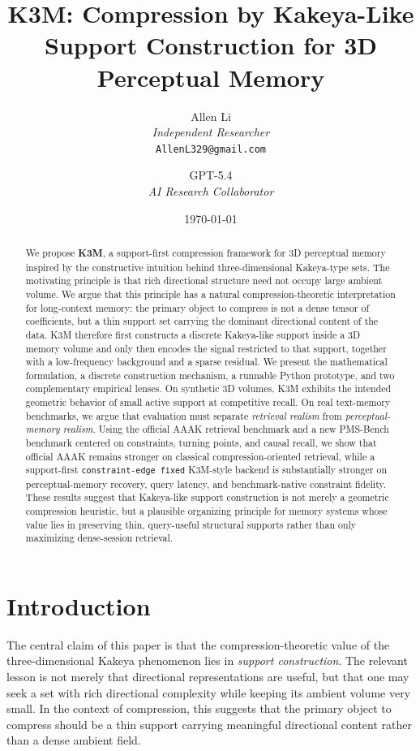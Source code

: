 \documentclass[11pt]{article}
\title{K3M: Compression by Kakeya-Like Support Construction for 3D Perceptual Memory}
\author{
Allen Li \\
\textit{Independent Researcher} \\
\texttt{AllenL329@gmail.com}
\and
GPT-5.4 \\
\textit{AI Research Collaborator}
}
\date{\today}
\begin{document}
\maketitle

\begin{abstract}
We propose \textbf{K3M}, a support-first compression framework for 3D perceptual memory inspired by the constructive intuition behind three-dimensional Kakeya-type sets. The motivating principle is that rich directional structure need not occupy large ambient volume. We argue that this principle has a natural compression-theoretic interpretation for long-context memory: the primary object to compress is not a dense tensor of coefficients, but a thin support set carrying the dominant directional content of the data. K3M therefore first constructs a discrete Kakeya-like support inside a 3D memory volume and only then encodes the signal restricted to that support, together with a low-frequency background and a sparse residual. We present the mathematical formulation, a discrete construction mechanism, a runnable Python prototype, and two complementary empirical lenses. On synthetic 3D volumes, K3M exhibits the intended geometric behavior of small active support at competitive recall. On real text-memory benchmarks, we argue that evaluation must separate \emph{retrieval realism} from \emph{perceptual-memory realism}. Using the official AAAK retrieval benchmark and a new PMS-Bench benchmark centered on constraints, turning points, and causal recall, we show that official AAAK remains stronger on classical compression-oriented retrieval, while a support-first \texttt{constraint-edge fixed} K3M-style backend is substantially stronger on perceptual-memory recovery, query latency, and benchmark-native constraint fidelity. These results suggest that Kakeya-like support construction is not merely a geometric compression heuristic, but a plausible organizing principle for memory systems whose value lies in preserving thin, query-useful structural supports rather than only maximizing dense-session retrieval.
\end{abstract}

\section{Introduction}
The central claim of this paper is that the compression-theoretic value of the three-dimensional Kakeya phenomenon lies in \emph{support construction}. The relevant lesson is not merely that directional representations are useful, but that one may seek a set with rich directional complexity while keeping its ambient volume very small. In the context of compression, this suggests that the primary object to compress should be a thin support carrying meaningful directional content rather than a dense ambient field.
\end{document}
